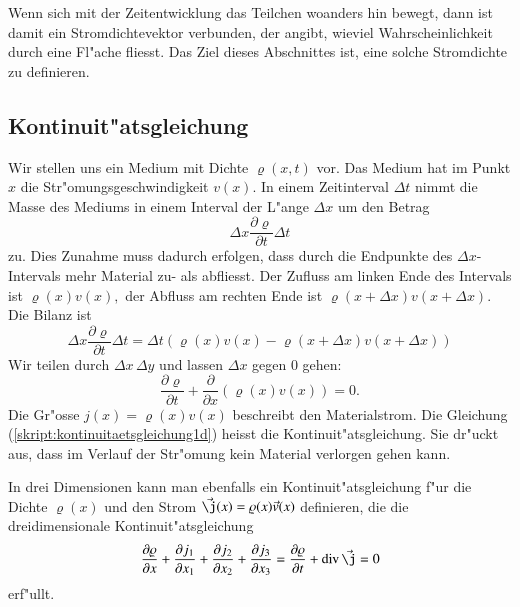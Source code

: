 Wenn sich mit der Zeitentwicklung das Teilchen woanders hin bewegt,
dann ist damit ein Stromdichtevektor verbunden, der angibt, 
wieviel Wahrscheinlichkeit durch eine Fl"ache fliesst.
Das Ziel dieses Abschnittes ist, eine solche Stromdichte zu
definieren.

\subsection{Kontinuit"atsgleichung}
Wir stellen uns ein Medium mit Dichte $\varrho(x,t)$ vor.
Das Medium hat im Punkt $x$ die Str"omungsgeschwindigkeit $v(x)$.
In einem Zeitinterval $\Delta t$ nimmt die Masse des Mediums
in einem Interval der L"ange $\Delta x$ um den Betrag
\[
\Delta x\frac{\partial\varrho}{\partial t}\Delta t
\]
zu.
Dies Zunahme muss dadurch erfolgen, dass durch die Endpunkte
des $\Delta x$-Intervals mehr Material zu- als abfliesst.
Der Zufluss am linken Ende des Intervals ist
$
\varrho(x) v(x),
$
der Abfluss am rechten Ende ist $\varrho(x+\Delta x)v(x+\Delta x)$.
Die Bilanz ist
\[
\Delta x\frac{\partial\varrho}{\partial t}\Delta t
=
\Delta t(
\varrho(x) v(x)
-
\varrho(x+\Delta x) v(x+\Delta x)
)
\]
Wir teilen durch $\Delta x\,\Delta y$ und lassen $\Delta x$ gegen 0 gehen:
\begin{equation}
\frac{\partial\varrho}{\partial t}
+\frac{\partial}{\partial x}(\varrho(x)v(x))
=0.
\label{skript:kontinuitaetsgleichung1d}
\end{equation}
Die Gr"osse $j(x)=\varrho(x)v(x)$ beschreibt den Materialstrom.
Die Gleichung (\ref{skript:kontinuitaetsgleichung1d}) heisst die
Kontinuit"atsgleichung.
Sie dr"uckt aus, dass im Verlauf der Str"omung kein Material verlorgen
gehen kann.

In drei Dimensionen kann man ebenfalls ein Kontinuit"atsgleichung
f"ur die Dichte $\varrho(x)$ und den Strom $\vec\j(x)=\varrho(x) \vec v(x)$
definieren, die die dreidimensionale 
Kontinuit"atsgleichung
\[
\frac{\partial\varrho}{\partial x}
+
\frac{\partial j_1}{\partial x_1}
+
\frac{\partial j_2}{\partial x_2}
+
\frac{\partial j_3}{\partial x_3}
=
\frac{\partial\varrho}{\partial t}+\operatorname{div}\vec\j
=0
\]
erf"ullt.

